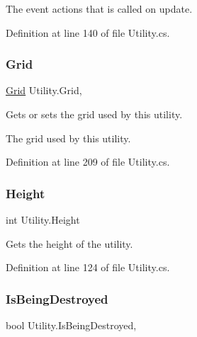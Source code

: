 The event actions that is called on update.

Definition at line 140 of file Utility.\+cs.

\mbox{\label{class_utility_a291d46edb60ed6838bd5c6cd7100a8ee}} 
\subsubsection{\texorpdfstring{Grid}{Grid}}
{\footnotesize\ttfamily \hyperlink{class_project_porcupine_1_1_power_network_1_1_grid}{Grid} Utility.\+Grid\hspace{0.3cm}{\ttfamily [get]}, {\ttfamily [set]}}



Gets or sets the grid used by this utility. 

The grid used by this utility.

Definition at line 209 of file Utility.\+cs.

\mbox{\label{class_utility_af3f8e91c0b54c05fa5e0306af9ab47d3}} 
\subsubsection{\texorpdfstring{Height}{Height}}
{\footnotesize\ttfamily int Utility.\+Height\hspace{0.3cm}{\ttfamily [get]}}



Gets the height of the utility. 



Definition at line 124 of file Utility.\+cs.

\mbox{\label{class_utility_a4162dd92a991cc994685f53ec3f2ddb4}} 
\subsubsection{\texorpdfstring{Is\+Being\+Destroyed}{IsBeingDestroyed}}
{\footnotesize\ttfamily bool Utility.\+Is\+Being\+Destroyed\hspace{0.3cm}{\ttfamily [get]}, {}}



